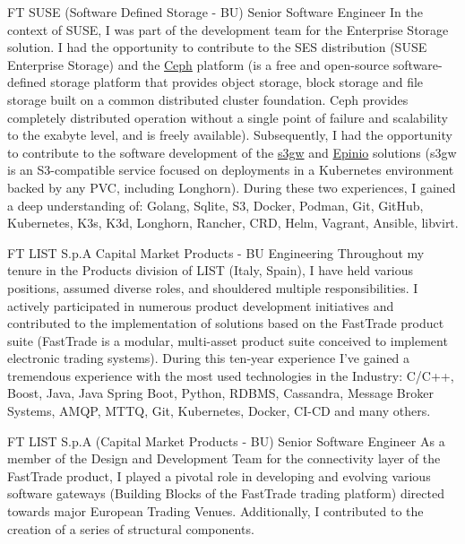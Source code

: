 \documentclass[10pt]{article} %
\begin{document}
\begin{paracol}{2}
{FT} %
{SUSE (Software Defined Storage - BU)} %
{Senior Software Engineer} %
{In the context of SUSE, I was part of the development team for the Enterprise Storage solution.
I had the opportunity to contribute to the SES distribution (SUSE Enterprise Storage) and the
\href{https://ceph.io/en/}{Ceph} platform (is a free and open-source software-defined storage
platform that provides object storage, block storage and file storage built on a common distributed
cluster foundation. Ceph provides completely distributed operation without a single point of failure
and scalability to the exabyte level, and is freely available). Subsequently, I had the opportunity
to contribute to the software development of the \href{https://github.com/aquarist-labs/s3gw}{s3gw}
and \href{https://github.com/epinio/epinio}{Epinio} solutions (s3gw is an S3-compatible service focused
on deployments in a Kubernetes environment backed by any PVC, including Longhorn). During these two
experiences, I gained a deep understanding of: Golang, Sqlite, S3, Docker, Podman,
Git, GitHub, Kubernetes, K3s, K3d, Longhorn, Rancher, CRD, Helm, Vagrant, Ansible, libvirt.} %

{FT}
{LIST S.p.A} %
{Capital Market Products - BU}
{Engineering}
{Throughout my tenure in the Products division of LIST (Italy, Spain), I have held various positions,
assumed diverse roles, and shouldered multiple responsibilities. I actively participated in numerous
product development initiatives and contributed to the implementation of solutions based on the
FastTrade product suite (FastTrade is a modular, multi-asset product suite conceived to implement
electronic trading systems). During this ten-year experience I've gained a tremendous experience
with the most used technologies in the Industry: C/C++, Boost, Java, Java Spring Boot, Python,
RDBMS, Cassandra, Message Broker Systems, AMQP, MTTQ, Git, Kubernetes, Docker, CI-CD and many others.}

{FT} %
{LIST S.p.A (Capital Market Products - BU)} %
{Senior Software Engineer} %
{As a member of the Design and Development Team for the connectivity layer of the FastTrade product,
I played a pivotal role in developing and evolving various software gateways (Building Blocks of the
FastTrade trading platform) directed towards major European Trading Venues.
Additionally, I contributed to the creation of a series of structural components.} %


\end{paracol}
\end{document}
